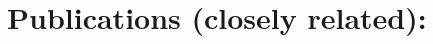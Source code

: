 



\begin{minipage}{\textwidth}



\vfill  
\nopagebreak



\vfill  
\nopagebreak




%
\vfill  
\nopagebreak


%
\vfill  
\nopagebreak

\newpage
\section*{Publications (closely related): }
\nocite{Ginsburg2019a}
\nocite{Ginsburg2018a}
\nocite{Ginsburg2017a}
\nocite{Ginsburg2016a}
\nocite{Ginsburg2015a}
\begin{footnotesize}

%

\end{footnotesize}


%
\end{minipage}


\begin{minipage}{\textwidth}
\end{minipage}
% 
% 
% 
% 
% 
% 
% 
% 
% 
% 
% 
% 
% 
% 
% 

